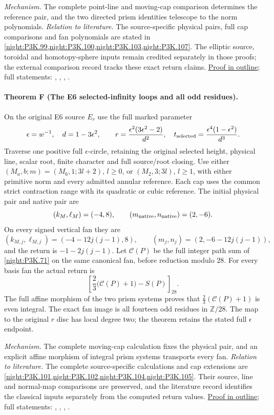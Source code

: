 \textit{Mechanism.} The complete point-line and moving-cap comparison determines
the reference pair, and the two directed prism identities telescope to the norm polynomials.
\textit{Relation to literature.} The source-specific physical pairs, full cap comparisons and
fan polynomials are stated in \cref{night:P3K.99,night:P3K.100,night:P3K.103,night:P3K.107}.
The elliptic source, toroidal and homotopy-sphere inputs remain
credited separately in those proofs; the external comparison record
tracks these exact return claims.
\hyperlink{outline-IV-E}{Proof in outline}; full statements: , , , .

\hypertarget{main-IV-F}{}
\paragraph{Theorem F (The E6 selected-infinity loops and all odd residues).}
\label{series:IV:F}
On the original E6 source $E_r$ use the full marked parameter
\[
 \epsilon=w^{-1},\quad d=1-3\epsilon^2,\qquad
 r=\frac{\epsilon^2(3\epsilon^2-2)}{d^2},\quad
 t_{
 \rm selected}=\frac{\epsilon^4(1-\epsilon^2)}{d^3}.
\]
Traverse one positive full $\epsilon$-circle, retaining the
original selected height, physical line, scalar root, finite
character and full source/root closing. Use either
$(M_a,b;m)=(M_6,1;3l+2)$, $l\ge0$, or
$(M_2,3;3l)$, $l\ge1$, with either primitive norm and every
admitted annular reference. Each cap uses the common strict
contraction range with its quadratic or cubic reference.
The initial physical pair and native pair are
\[
 (k_M,\ell_M)=(-4,8),\qquad(m_{\rm native},n_{\rm native})=(2,-6).
\]
On every signed vertical fan they are
\[
 (k_{M,j},\ell_{M,j})=(-4-12j(j-1),8),\qquad
 (m_j,n_j)=(2,-6-12j(j-1)),
\]
and the return is $-1-2j(j-1)$.
Let $\mathscr C(P)$ be the full integer path sum of
\cref{night:P3K.71} on the same canonical fan, before reduction
modulo $28$. For every basis fan the actual return is
\[
 \left[\frac23\bigl(\mathscr C(P)+1\bigr)-S(P)\right]_{28}.
\]
The full affine morphism of the two prism systems proves that
$\tfrac23(\mathscr C(P)+1)$ is even integral. The exact fan image
is all fourteen odd residues in $\mathbb Z/28$. The map to the
original $r$ disc has local degree two; the theorem retains the
stated full $\epsilon$ endpoint.

\textit{Mechanism.} The complete moving-cap calculation fixes the physical pair,
and an explicit affine morphism of integral prism systems transports every fan.
\textit{Relation to literature.} The complete source-specific calculations and cap extensions
are \cref{night:P3K.101,night:P3K.102,night:P3K.104,night:P3K.105}.
Their source, line and normal-map comparisons are preserved, and
the literature record identifies the classical inputs separately
from the computed return values.
\hyperlink{outline-IV-F}{Proof in outline}; full statements: , , , .

